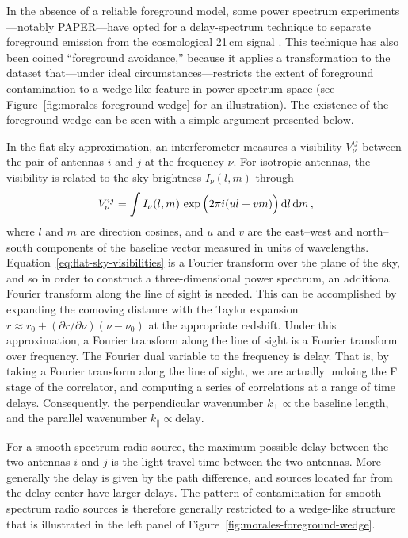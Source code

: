 \begin{bibunit}
In the absence of a reliable foreground model, some power spectrum experiments---notably
PAPER---have opted for a delay-spectrum technique to separate foreground emission from the
cosmological 21\,cm signal \citep{2012ApJ...756..165P}. This technique has also been coined
``foreground avoidance,'' because it applies a transformation to the dataset that---under ideal
circumstances---restricts the extent of foreground contamination to a wedge-like feature in power
spectrum space (see Figure~\ref{fig:morales-foreground-wedge} for an illustration). The existence of
the foreground wedge can be seen with a simple argument presented below.

In the flat-sky approximation, an interferometer measures a visibility $V^{ij}_\nu$ between the
pair of antennas $i$ and $j$ at the frequency $\nu$. For isotropic antennas, the visibility is
related to the sky brightness $I_\nu(l, m)$ through
\begin{equation}\label{eq:flat-sky-visibilities}
    V^{ij}_\nu = \int I_\nu(l, m)\,\exp\Big(2\pi i (ul + vm)\Big)\,{\textrm d} l\,{\textrm d} m\,,
\end{equation}
where $l$ and $m$ are direction cosines, and $u$ and $v$ are the east--west and north--south
components of the baseline vector measured in units of wavelengths.
Equation~\ref{eq:flat-sky-visibilities} is a Fourier transform over the plane of the sky, and so in
order to construct a three-dimensional power spectrum, an additional Fourier transform along the
line of sight is needed. This can be accomplished by expanding the comoving distance with the Taylor
expansion $r \approx r_0 + (\partial r/\partial \nu)(\nu - \nu_0)$ at the appropriate redshift.
Under this approximation, a Fourier transform along the line of sight is a Fourier transform over
frequency.  The Fourier dual variable to the frequency is delay. That is, by taking a Fourier
transform along the line of sight, we are actually undoing the F stage of the correlator, and
computing a series of correlations at a range of time delays.  Consequently, the perpendicular
wavenumber $k_\perp \propto \text{the baseline length}$, and the parallel wavenumber $k_\parallel
\propto \text{delay}$.

For a smooth spectrum radio source, the maximum possible delay between the two antennas $i$ and $j$
is the light-travel time between the two antennas. More generally the delay is given by the path
difference, and sources located far from the delay center have larger delays. The pattern of
contamination for smooth spectrum radio sources is therefore generally restricted to a wedge-like
structure that is illustrated in the left panel of Figure~\ref{fig:morales-foreground-wedge}.


\end{bibunit}
